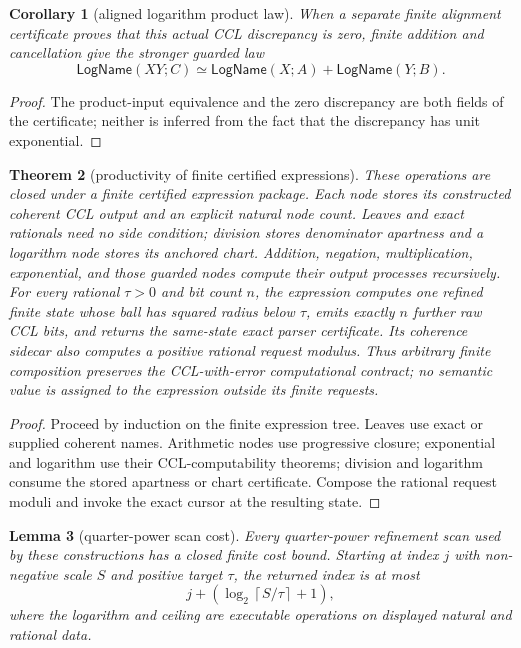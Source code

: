 \documentclass[10pt]{article}
\newtheorem{theorem}{Theorem}[section]
\newtheorem{lemma}[theorem]{Lemma}
\newtheorem{corollary}[theorem]{Corollary}
\theoremstyle{definition}
\theoremstyle{remark}
\begin{document}
\begin{corollary}[aligned logarithm product law]
When a separate
finite alignment certificate proves that this actual CCL discrepancy is
zero, finite addition and cancellation give the stronger guarded law
\[
 \mathsf{LogName}(XY;C)\simeq
   \mathsf{LogName}(X;A)+\mathsf{LogName}(Y;B).
 \tag{3.31j'}
\]
\end{corollary}

\begin{proof}
The product-input equivalence and the zero discrepancy are both fields of the
certificate; neither is inferred from the fact that the discrepancy has unit
exponential.
\end{proof}

\begin{theorem}[productivity of finite certified expressions]
These operations are closed under a finite certified expression package.
Each node stores its constructed coherent CCL output and an explicit natural
node count.  Leaves and exact rationals need no side condition; division
stores denominator apartness and a logarithm node stores its anchored chart.
Addition, negation, multiplication, exponential, and those guarded nodes
compute their output processes recursively.  For every rational $\tau>0$
and bit count $n$, the expression computes one refined finite state whose
ball has squared radius below $\tau$, emits exactly $n$ further raw CCL bits,
and returns the same-state exact parser certificate.  Its coherence sidecar
also computes a positive rational request modulus.  Thus arbitrary finite
composition preserves the CCL-with-error computational contract; no semantic
value is assigned to the expression outside its finite requests.
\end{theorem}

\begin{proof}
Proceed by induction on the finite expression tree.  Leaves use exact or
supplied coherent names.  Arithmetic nodes use progressive closure;
exponential and logarithm use their CCL-computability theorems; division and
logarithm consume the stored apartness or chart certificate.  Compose the
rational request moduli and invoke the exact cursor at the resulting state.
\end{proof}

\begin{lemma}[quarter-power scan cost]
Every quarter-power refinement scan used by these constructions has a closed
finite cost bound.  Starting at index $j$ with non-negative scale $S$ and
positive target $\tau$, the returned index is at most
\[
 j+\left(\log_2\!\left\lceil S/\tau\right\rceil+1\right),
 \tag{3.31k}
\]
where the logarithm and ceiling are executable operations on displayed
natural and rational data.
\end{lemma}
\end{document}
